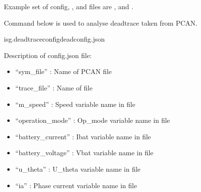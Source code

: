 \documentclass[letterpaper,10pt,english]{sphinxmanual}
\begin{document}
\sphinxAtStartPar
Example set of config, , and  files are ,  and .

\sphinxAtStartPar
Command below is used to analyse deadtrace taken from PCAN.
\def\sphinxLiteralBlockLabel{\label{\detokenize{deadtrace:id1}}}
\begin{sphinxVerbatim}[commandchars=\\\{\}]
isg.deadtrace\PYGZhy{}\PYGZhy{}configdeadconfig.json
\end{sphinxVerbatim}

\sphinxAtStartPar
Description of config.json file:
\begin{itemize}
\item {} 
\sphinxAtStartPar
“sym\_file” : Name of PCAN  file

\item {} 
\sphinxAtStartPar
“trace\_file” : Name of  file

\item {} 
\sphinxAtStartPar
“m\_speed” : Speed variable name in  file

\item {} 
\sphinxAtStartPar
“operation\_mode” : Op\_mode variable name in  file

\item {} 
\sphinxAtStartPar
“battery\_current” : Ibat variable name in  file

\item {} 
\sphinxAtStartPar
“battery\_voltage” : Vbat variable name in  file

\item {} 
\sphinxAtStartPar
“u\_theta” : U\_theta variable name in  file

\item {} 
\sphinxAtStartPar
“ia” : Phase current variable name in  file

\end{itemize}
\end{document}
